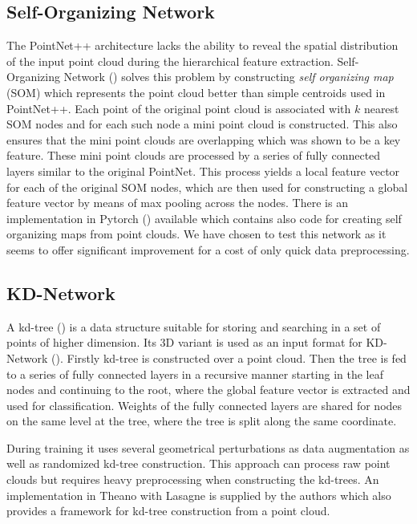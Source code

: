 \subsection{Self-Organizing Network}
The PointNet++ architecture lacks the ability to reveal the spatial distribution of the input point cloud during the hierarchical feature extraction. Self-Organizing Network (\cite{li_so-net:_2018}) solves this problem by constructing \textit{self organizing map} (SOM) which represents the point cloud better than simple centroids used in PointNet++. Each point of the original point cloud is associated with $k$ nearest SOM nodes and for each such node a mini point cloud is constructed. This also ensures that the mini point clouds are overlapping which was shown to be a key feature. These mini point clouds are processed by a series of fully connected layers similar to the original PointNet. This process yields a local feature vector for each of the original SOM nodes, which are then used for constructing a global feature vector by means of max pooling across the nodes. There is an implementation in Pytorch (\cite{li_sonet_2018}) available which contains also code for creating self organizing maps from point clouds. We have chosen to test this network as it seems to offer significant improvement for a cost of only quick data preprocessing.

\subsection{KD-Network}
A kd-tree (\cite{bentley_multidimensional_1975}) is a data structure suitable for storing and searching in a set of points of higher dimension. Its 3D variant is used as an input format for KD-Network (\cite{klokov_escape_2017}). Firstly kd-tree is constructed over a point cloud. Then the tree is fed to a series of fully connected layers in a recursive manner starting in the leaf nodes and continuing to the root, where the global feature vector is extracted and used for classification. Weights of the fully connected layers are shared for nodes on the same level at the tree, where the tree is split along the same coordinate. \par
During training it uses several geometrical perturbations as data augmentation as well as randomized kd-tree construction. This approach can process raw point clouds but requires heavy preprocessing when constructing the kd-trees.
An implementation in Theano with Lasagne \cite{klokov_kd-net_2017} is supplied by the authors which also provides a framework for kd-tree construction from a point cloud.

